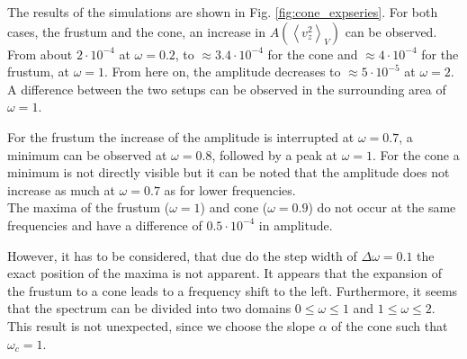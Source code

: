 The results of the simulations are shown in Fig. \ref{fig:cone_expseries}.
For both cases, the frustum and the cone, an increase in $A\left(\left<v^2_z\right>_V\right)$ can be observed.
From  about $2\cdot10^{-4}$ at $\omega=0.2$, to  $\approx 3.4\cdot10^{-4}$ for the cone and $\approx 4\cdot10^{-4}$ for the frustum,  at $\omega=1$.
From here on, the amplitude decreases to $\approx 5\cdot10^{-5}$ at $\omega=2$.
A difference between the two setups can be observed in the surrounding area of $\omega=1$.

For the frustum the increase of the amplitude is interrupted at $\omega=0.7$, a minimum can be observed at $\omega=0.8$, followed by
a peak at $\omega=1$. For the cone a minimum is not directly visible but it can be noted that the
amplitude does not increase as much at $\omega=0.7$ as for lower frequencies.\\
The maxima of the frustum ($\omega=1$) and cone ($\omega=0.9$) do not occur
at the same frequencies and have a difference of $0.5\cdot10^{-4}$ in amplitude.

However, it has to be considered, that due do the step width of $\Delta\omega = 0.1$ the exact position of the maxima is not apparent.
It appears that the expansion of the frustum to a cone leads to a frequency shift to the left.
Furthermore, it seems that the spectrum can be divided into two domains $0\leq\omega\leq1$ and $1 \leq \omega\leq 2$.
This result is not unexpected, since we choose the slope $\alpha$ of the cone such that $\omega_c=1$.

\clearpage

